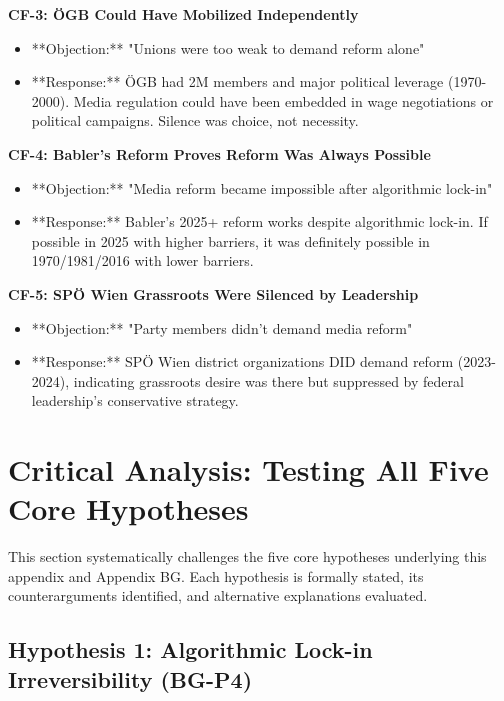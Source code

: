 \textbf{CF-3: ÖGB Could Have Mobilized Independently}
\begin{itemize}
\item **Objection:** "Unions were too weak to demand reform alone"
\item **Response:** ÖGB had 2M members and major political leverage (1970-2000). Media regulation could
  have been embedded in wage negotiations or political campaigns. Silence was choice, not necessity.
\end{itemize}

\textbf{CF-4: Babler's Reform Proves Reform Was Always Possible}
\begin{itemize}
\item **Objection:** "Media reform became impossible after algorithmic lock-in"
\item **Response:** Babler's 2025+ reform works despite algorithmic lock-in. If possible in 2025 with
  higher barriers, it was definitely possible in 1970/1981/2016 with lower barriers.
\end{itemize}

\textbf{CF-5: SPÖ Wien Grassroots Were Silenced by Leadership}
\begin{itemize}
\item **Objection:** "Party members didn't demand media reform"
\item **Response:** SPÖ Wien district organizations DID demand reform (2023-2024), indicating grassroots
  desire was there but suppressed by federal leadership's conservative strategy.
\end{itemize}


\section*{Critical Analysis: Testing All Five Core Hypotheses}

This section systematically challenges the five core hypotheses underlying this appendix and Appendix BG.
Each hypothesis is formally stated, its counterarguments identified, and alternative explanations evaluated.

\subsection*{Hypothesis 1: Algorithmic Lock-in Irreversibility (BG-P4)}

